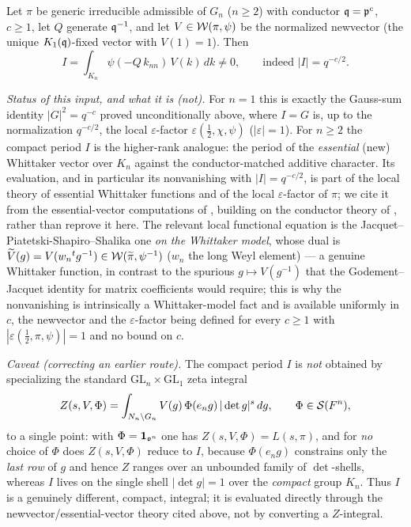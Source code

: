 \begin{qtwotheorem}\label{thm:newvector}
Let $\pi$ be generic irreducible admissible of $G_n$ \textup{(}$n\ge2$\textup{)} with conductor
$\mathfrak{q}=\mathfrak{p}^{c}$, $c\ge1$, let $Q$ generate $\mathfrak{q}^{-1}$, and let $V\in\mathcal{W}(\pi,\psi)$ be the
normalized newvector \textup{(}the unique $K_1(\mathfrak{q})$-fixed vector with $V(1)=1$\textup{)}. Then
\[
I=\int_{K_n}\psi(-Q\,k_{nn})\,V(k)\,dk\neq0 ,\qquad\text{indeed } |I|=q^{-c/2}.
\]
\end{qtwotheorem}

\noindent\emph{Status of this input, and what it is \textup{(}not\textup{)}.} For $n=1$ this is
exactly the Gauss-sum identity $|G|^2=q^{-c}$ proved unconditionally above, where $I=G$ is, up to the
normalization $q^{-c/2}$, the local $\varepsilon$-factor $\varepsilon(\tfrac12,\chi,\psi)$
\textup{(}$|\varepsilon|=1$\textup{)}. For $n\ge2$ the compact period $I$ is the higher-rank
analogue: the period of the \emph{essential} \textup{(}new\textup{)} Whittaker vector over $K_n$
against the conductor-matched additive character. Its evaluation, and in particular its
nonvanishing with $|I|=q^{-c/2}$, is part of the local theory of essential Whittaker functions and
of the local $\varepsilon$-factor of $\pi$; we cite it from the essential-vector computations of
\cite{Matringe}, building on the conductor theory of \cite{JPSS81}, rather than reprove it here.
The relevant local functional equation is the Jacquet--Piatetski-Shapiro--Shalika one
\emph{on the Whittaker model}, whose dual is $\widetilde{V}(g)=V(w_n{}^{t}g^{-1})\in
\mathcal{W}(\widetilde{\pi},\psi^{-1})$ \textup{(}$w_n$ the long Weyl element\textup{)} --- a genuine
Whittaker function, in contrast to the spurious $g\mapsto V(g^{-1})$ that the Godement--Jacquet
identity for matrix coefficients would require; this is why the nonvanishing is intrinsically a
Whittaker-model fact and is available uniformly in $c$, the newvector and the $\varepsilon$-factor
being defined for every $c\ge1$ with $|\varepsilon(\tfrac12,\pi,\psi)|=1$ and no bound on $c$.

\medskip
\noindent\emph{Caveat \textup{(}correcting an earlier route\textup{)}.} The compact period $I$ is
\emph{not} obtained by specializing the standard $\mathrm{GL}_n\times\mathrm{GL}_1$ zeta integral
\[
Z(s,V,\Phi)=\int_{N_n\backslash G_n}V(g)\,\Phi(e_n g)\,|\det g|^{s}\,dg ,
\qquad\Phi\in\mathcal S(F^{n}),
\]
to a single point: with $\Phi=\mathbf 1_{\mathfrak{o}^{n}}$ one has $Z(s,V,\Phi)=L(s,\pi)$, and for
\emph{no} choice of $\Phi$ does $Z(s,V,\Phi)$ reduce to $I$, because $\Phi(e_ng)$ constrains only the
\emph{last row} of $g$ and hence $Z$ ranges over an unbounded family of $\det$-shells, whereas $I$
lives on the single shell $|\det g|=1$ over the \emph{compact} group $K_n$. Thus $I$ is a genuinely
different, compact, integral; it is evaluated directly through the newvector/essential-vector theory
cited above, not by converting a $Z$-integral.

